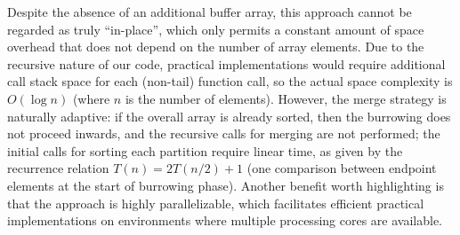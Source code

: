 \note Despite the absence of an additional buffer array, this approach cannot
be regarded as truly ``in-place'', which only permits a constant amount
of space overhead that does not depend on the number of array elements.
Due to the recursive nature of our code, practical implementations would
require additional call stack space for each (non-tail) function call, so the
actual space complexity is $O(\log n)$ (where $n$ is the number of elements).
However, the merge strategy is naturally adaptive: if the overall array is
already sorted, then the burrowing does not proceed inwards, and the recursive
calls for merging are not performed; the initial calls for sorting each partition
require linear time, as given by the recurrence relation $T(n) = 2T(n/2) + 1$
(one comparison between endpoint elements at the start of burrowing phase).
Another benefit worth highlighting is that the approach is highly
parallelizable, which facilitates efficient practical implementations
on environments where multiple processing cores are available.

\enlargethispage*{\baselineskip}
\pagebreak
